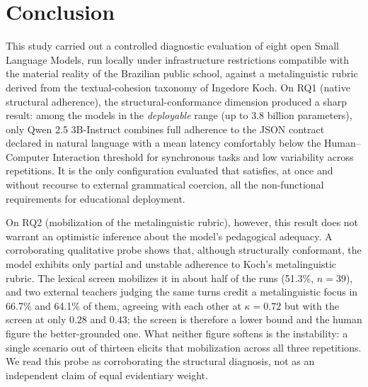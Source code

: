 \documentclass{sbc2023}%
\begin{document}
\section{Conclusion}
\label{sec:conclusion}

This study carried out a controlled diagnostic evaluation of eight open Small Language Models, run locally under infrastructure restrictions compatible with the material reality of the Brazilian public school, against a metalinguistic rubric derived from the textual-cohesion taxonomy of Ingedore Koch. On RQ1 (native structural adherence), the structural-conformance dimension produced a sharp result: among the models in the \textit{deployable} range (up to 3.8 billion parameters), only Qwen 2.5 3B-Instruct combines full adherence to the JSON contract declared in natural language with a mean latency comfortably below the Human--Computer Interaction threshold for synchronous tasks and low variability across repetitions. It is the only configuration evaluated that satisfies, at once and without recourse to external grammatical coercion, all the non-functional requirements for educational deployment.

On RQ2 (mobilization of the metalinguistic rubric), however, this result does not warrant an optimistic inference about the model's pedagogical adequacy. A corroborating qualitative probe shows that, although structurally conformant, the model exhibits only partial and unstable adherence to Koch's metalinguistic rubric. The lexical screen mobilizes it in about half of the runs (51.3\%, $n=39$), and two external teachers judging the same turns credit a metalinguistic focus in 66.7\% and 64.1\% of them, agreeing with each other at $\kappa = 0.72$ but with the screen at only $0.28$ and $0.43$; the screen is therefore a lower bound and the human figure the better-grounded one. What neither figure softens is the instability: a single scenario out of thirteen elicits that mobilization across all three repetitions. We read this probe as corroborating the structural diagnosis, not as an independent claim of equal evidentiary weight.
\end{document}
